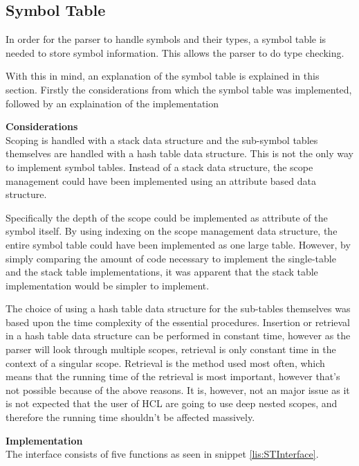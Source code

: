 \subsection{Symbol Table}
\label{sec:symbolTable}
In order for the parser to handle symbols and their types, a symbol table is needed to store symbol information.
This allows the parser to do type checking.

With this in mind, an explanation of the symbol table is explained in this section. 
Firstly the considerations from which the symbol table was implemented, followed by an explaination of the implementation

\textbf{Considerations}\\
Scoping is handled with a stack data structure and the sub-symbol tables themselves are handled with a hash table data structure.
This is not the only way to implement symbol tables.
Instead of a stack data structure, the scope management could have been implemented using an attribute based data structure.

Specifically the depth of the scope could be implemented as attribute of the symbol itself.
By using indexing on the scope management data structure, the entire symbol table could have been implemented as one large table.
However, by simply comparing the amount of code necessary to implement the single-table and the stack table implementations, it was apparent that the stack table implementation would be simpler to implement.

The choice of using a hash table data structure for the sub-tables themselves was based upon the time complexity of the essential procedures.
Insertion or retrieval in a hash table data structure can be performed in constant time, however as the parser will look through multiple scopes, retrieval is only constant time in the context of a singular scope.
Retrieval is the method used most often, which means that the running time of the retrieval is most important, however that's not possible because of the above reasons. 
It is, however, not an major issue as it is not expected that the user of HCL are going to use deep nested scopes, and therefore the running time shouldn't be affected massively.

\textbf{Implementation}\\
The interface consists of five functions as seen in snippet \ref{lis:STInterface}.

